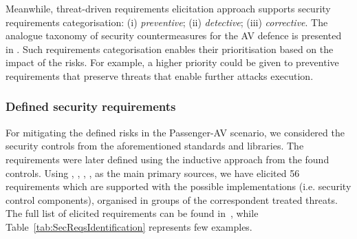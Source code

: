 \documentclass[manuscript]{acmart}
\begin{document}
Meanwhile, threat-driven requirements elicitation approach supports security requirements categorisation: (i) \textit{preventive}; (ii) \textit{detective}; (iii) \textit{corrective}. The analogue taxonomy of security countermeasures for the AV defence is presented in  \cite{AVsecurity_AttacksDefTaxonomy_Thing_Wu}. Such requirements categorisation enables their prioritisation based on the impact of the risks. For example, a higher priority could be given to preventive requirements that preserve threats that enable further attacks execution. 

\subsubsection{Defined security requirements}
For mitigating the defined risks in the Passenger-AV scenario, we considered the security controls from the aforementioned standards and libraries. The requirements were later defined using the inductive approach from the found controls.
Using \cite{OWASP_webPage}, \cite{Capec}, \cite{CISControls}, \cite{nist_sp800_63b}, \cite{Mitre_ATT_CK} as the main primary sources, we have elicited 56 requirements which are supported with the possible implementations (i.e. security control components), organised in groups of the correspondent treated threats. The full list of elicited requirements can be found in~\cite{PassengerDataProtection}, while Table~\ref{tab:SecReqsIdentification} represents few examples.
\end{document}
